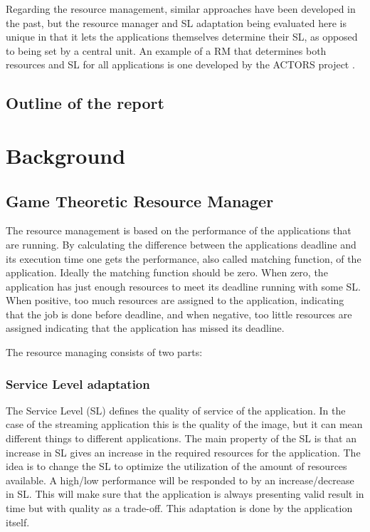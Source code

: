 \documentclass[nobiblatex]{LTHthesis}
\begin{document}
Regarding the resource management, similar approaches have been developed in the past, but the resource manager and SL adaptation being evaluated here is unique in that it lets the applications themselves determine their SL, as opposed to being set by a central unit. An example of a RM that determines both resources and SL for all applications is one developed by the ACTORS project  \cite{actors1}.  


\section{Outline of the report}

\chapter{Background}

\section{Game Theoretic Resource Manager}
The resource management is based on the performance of the applications that are running. By calculating the difference between the applications deadline and its execution time one gets the performance, also called matching function, of the application. Ideally the matching function should be zero. When zero, the  application has just enough resources to meet its deadline running with some SL. When positive, too much resources are assigned to the application, indicating that the job is done before deadline, and when negative, too little resources are assigned indicating that the application has missed its deadline.

The resource managing consists of two parts:
\subsection{Service Level adaptation}
The Service Level (SL) defines the quality of service of the application. In the case of the streaming application this is the quality of the image, but it can mean different things to different applications. The main property of the SL is that an increase in SL gives an increase in the required resources for the application. The idea is to change the SL to optimize the utilization of the amount of resources available. A high/low performance will be responded to by an increase/decrease in SL.
This will make sure that the application is always presenting valid result in time but with quality as a trade-off. This adaptation is done by the application itself.
\end{document}

